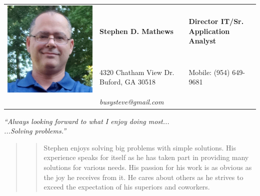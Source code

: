\documentclass[10pt]{report}
\begin{document}
{
\setlength{\arrayrulewidth}{.4em}

\noindent
\begin{table}
\begin{tabular}{ L{5em} L{.5\textwidth}  R{.35\textwidth} }
\hline
{}
& \textbf{Stephen D. Mathews} & \textbf{Director IT/Sr. Application Analyst} \\
& 4320 Chatham View Dr. Buford, GA 30518 & Mobile: (954) 649-9681 \\
& \textsl{busysteve@gmail.com} &   \\
\hline
\end{tabular}
	\center
	\textsl{``Always looking forward to what I enjoy doing most...} \\
	\textsl{...Solving problems.''}
	\begin{quote}
		\begin{quote}
			Stephen enjoys solving big problems with simple solutions. His experience speaks for itself as he has taken part in providing many solutions for various needs. His passion for his work is as obvious as the joy he receives from it. He cares about others as he strives to exceed the expectation of his superiors and coworkers.
		\end{quote}
	\end{quote}
\end{table}
}


\end{document}
